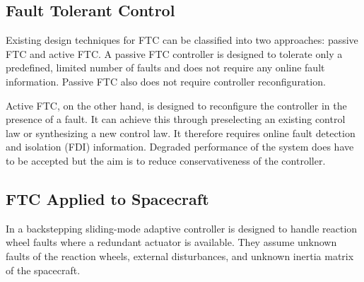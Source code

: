 \subsection{Fault Tolerant Control}
Existing design techniques for FTC can be classified into two approaches: passive FTC and active FTC. A passive FTC controller is designed to tolerate only a predefined, limited number of faults and does not require any online fault information. Passive FTC also does not require controller reconfiguration. \cite{yinReviewRecentDevelopment2016}

Active FTC, on the other hand, is designed to reconfigure the controller in the presence of a fault. It can achieve this through preselecting an existing control law or synthesizing a new control law. It therefore requires online fault detection and isolation (FDI) information. Degraded performance of the system does have to be accepted but the aim is to reduce conservativeness of the controller. \cite{yinReviewRecentDevelopment2016}

\subsection{FTC Applied to Spacecraft}
In \cite{jiangAdaptiveBacksteppingFaulttolerant2010} a backstepping sliding-mode adaptive controller is designed to handle reaction wheel faults where a redundant actuator is available. They assume unknown faults of the reaction wheels, external disturbances, and unknown inertia matrix of the spacecraft. 

